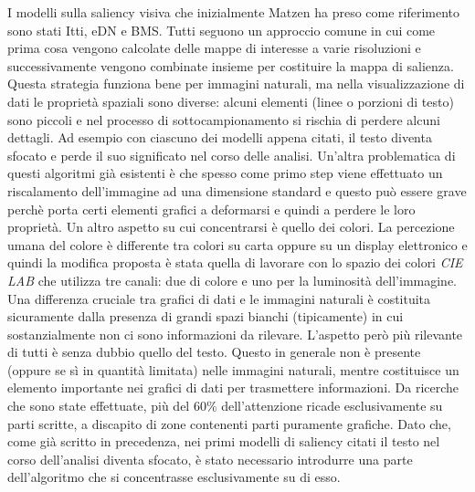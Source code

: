 \documentclass[%
	corpo=12pt,
    twoside,
    stile=classica,
    oldstyle,
    tipotesi=custom,
    greek,
    evenboxes,
]{toptesi}
\begin{document}
{I modelli sulla saliency visiva che inizialmente Matzen ha preso come riferimento sono stati Itti, eDN e BMS. Tutti seguono un approccio comune in cui come prima cosa vengono calcolate delle mappe di interesse a varie risoluzioni e successivamente vengono combinate insieme per costituire la mappa di salienza. Questa strategia funziona bene per immagini naturali, ma nella visualizzazione di dati le proprietà spaziali sono diverse: alcuni elementi (linee o porzioni di testo) sono piccoli e nel processo di sottocampionamento si rischia di perdere alcuni dettagli. Ad esempio con ciascuno dei modelli appena citati, il testo diventa sfocato e perde il suo significato nel corso delle analisi. Un'altra problematica di questi algoritmi già esistenti è che spesso come primo step viene effettuato un riscalamento dell'immagine ad una dimensione standard e questo può essere grave perchè porta certi elementi grafici a deformarsi e quindi a perdere le loro proprietà. Un altro aspetto su cui concentrarsi è quello dei colori. La percezione umana del colore è differente tra colori su carta oppure su un display elettronico e quindi la modifica proposta è stata quella di lavorare con lo spazio dei colori \textit{CIE LAB} che utilizza tre canali: due di colore e uno per la luminosità dell'immagine.  Una differenza cruciale tra grafici di dati e le immagini naturali è costituita sicuramente dalla presenza di grandi spazi bianchi (tipicamente) in cui sostanzialmente non ci sono informazioni da rilevare. L'aspetto però più rilevante di tutti è senza dubbio quello del testo. Questo in generale non è presente (oppure se sì in quantità limitata) nelle immagini naturali, mentre costituisce un elemento importante nei grafici di dati per trasmettere informazioni. Da ricerche che sono state effettuate, più del 60\% dell'attenzione ricade esclusivamente su parti scritte, a discapito di zone contenenti parti puramente grafiche. Dato che, come già scritto in precedenza, nei primi modelli di saliency citati il testo nel corso dell'analisi diventa sfocato, è stato necessario introdurre una parte dell'algoritmo che si concentrasse esclusivamente su di esso.

}
\end{document}
